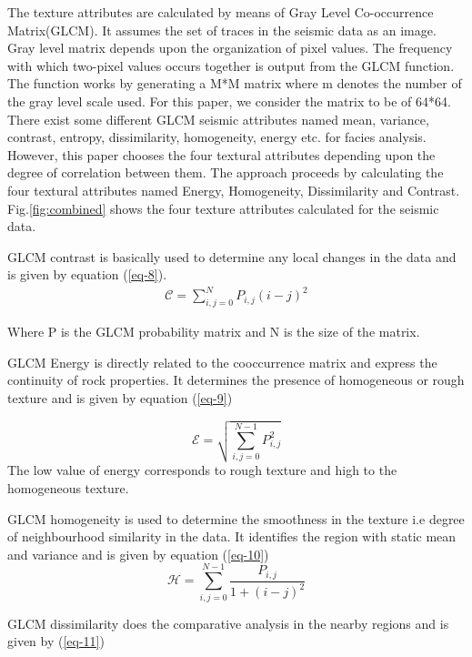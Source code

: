 \documentclass[a4paper]{article}
\begin{document}
The texture attributes are calculated by means of Gray Level Co-occurrence Matrix(GLCM)\cite{texture}. It assumes the set of traces in the seismic data as an image. Gray level matrix depends upon the organization of pixel values. The frequency with which two-pixel values occurs together is output from the GLCM function\cite{texture}. The function works by generating a M*M matrix where m denotes the number of the gray level scale used. For this paper, we consider the matrix to be of 64*64. There exist some different GLCM seismic attributes named mean, variance, contrast, entropy, dissimilarity, homogeneity, energy etc. for facies analysis. However, this paper chooses the four textural attributes depending upon the degree of correlation between them. The approach proceeds by calculating the four textural attributes named Energy, Homogeneity, Dissimilarity and Contrast. Fig.\ref{fig:combined} shows the four texture attributes calculated for the seismic data. 

GLCM contrast is basically used to determine any local changes in the data and is given by equation (\ref{eq-8})\cite{attributes}.
\begin{eqnarray}
\mathcal{C}= \sum\limits_{i,j=0}^{N} P_{i,j}(i-j)^2 \label{eq-8}
\end{eqnarray}

Where P is the GLCM probability matrix and N is the size of the matrix.

\smallskip
GLCM Energy\cite{formula} is directly related to the cooccurrence matrix and express the continuity of rock properties. It determines the presence of homogeneous or rough texture and is given by equation (\ref{eq-9})

\begin{equation}
\mathcal{E}= \sqrt{\sum\limits_{i,j=0}^{N-1} P_{i,j}^2} \label{eq-9}
\end{equation}
\smallskip
The low value of energy corresponds to rough texture and high to the homogeneous texture\cite{attributes}.

\smallskip
GLCM homogeneity\cite{formula} is used to determine the smoothness in the texture i.e degree of neighbourhood similarity in the data. It identifies the region with static mean and variance and is given by equation (\ref{eq-10})
\begin{equation}
\mathcal{H}=\sum\limits_{i,j=0}^{N-1} \frac{P_{i,j}}{1+(i-j)^2} \label{eq-10}
\end{equation}

GLCM dissimilarity\cite{formula} does the comparative analysis in the nearby regions and is given by (\ref{eq-11})
\end{document}
